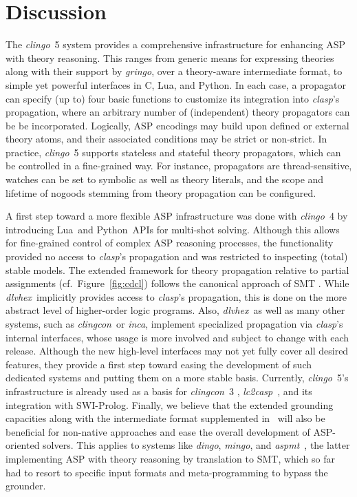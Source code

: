 \documentclass[a4paper,USenglish]{oasics-v2016}
\newcommand{\sysfont}{\textit}
\newcommand{\aspmt}{\sysfont{aspmt}}
\newcommand{\clasp}{\sysfont{clasp}}
\newcommand{\clingcon}{\sysfont{clingcon}}
\newcommand{\clingo}{\sysfont{clingo}}
\newcommand{\dingo}{\sysfont{dingo}}
\newcommand{\dlvhex}{\sysfont{dlvhex}}
\newcommand{\gringo}{\sysfont{gringo}}
\newcommand{\inca}{\sysfont{inca}}
\newcommand{\lctocasp}{\sysfont{lc2casp}}
\newcommand{\mingo}{\sysfont{mingo}}
\newcommand{\python}{Python}
\newcommand{\lua}{Lua}
\newcommand{\C}{C}
\begin{document}
\section{Discussion}\label{sec:discussion}

The \clingo~5 system provides a comprehensive infrastructure for enhancing ASP with theory reasoning.
This ranges from
generic means for expressing theories along with their support by \gringo,
over a theory-aware intermediate format,
to simple yet powerful interfaces in \C, \lua, and \python.
In each case, a propagator can    specify (up to) four basic functions to customize its integration into \clasp's propagation,
where an arbitrary number of (independent) theory propagators can be be incorporated.
%
Logically, ASP encodings may build upon defined or external theory atoms,
and their associated conditions may be strict or non-strict.
In practice,
\clingo~5 supports stateless and stateful theory propagators, which can be controlled in a fine-grained way.
%
For instance, propagators are thread-sensitive, watches can be set to symbolic as well as theory literals,
and the scope and lifetime of nogoods stemming from theory propagation can be configured.

A first step toward a more flexible ASP infrastructure
was done with \clingo~4 \cite{gekakasc14b} by introducing \lua\ and \python\ APIs for multi-shot solving.
Although this allows for fine-grained control of complex ASP reasoning processes,
the functionality provided no access to \clasp's propagation and was restricted to inspecting (total) stable models.
%
The extended framework for theory propagation relative to partial assignments (cf.\ Figure~\ref{fig:cdcl})
follows the canonical approach of SMT \cite{baseseti09a}.
%
%
While \dlvhex\ implicitly provides access to \clasp's propagation,
this is done on the more abstract level of higher-order logic programs.
Also, \dlvhex\ as well as many other systems, such as \clingcon\ or \inca,
implement specialized propagation via \clasp's internal interfaces,
whose usage is more involved and subject to change with each release.
%
Although the new high-level interfaces may not yet fully cover all desired features,
they provide a first step toward easing the development of such dedicated systems and
putting them on a more stable basis.
%
Currently,
\clingo~5's infrastructure is already used as a basis for
\clingcon~3 \cite{bakakaossc16a},
%
\lctocasp\ \cite{cakaossc16a},
and
its integration with SWI-Prolog.
%
Finally, we believe that the extended grounding capacities along with the intermediate format supplemented in~\cite{gekakaosscwa16b}  %
will also be beneficial for non-native approaches and ease the overall development of ASP-oriented solvers.
This applies to systems like \dingo, \mingo, and \aspmt\ \cite{barlee14b},
the latter implementing ASP with theory reasoning by translation to SMT,
which so far had to resort to specific input formats and meta-programming to bypass the grounder.


\end{document}
